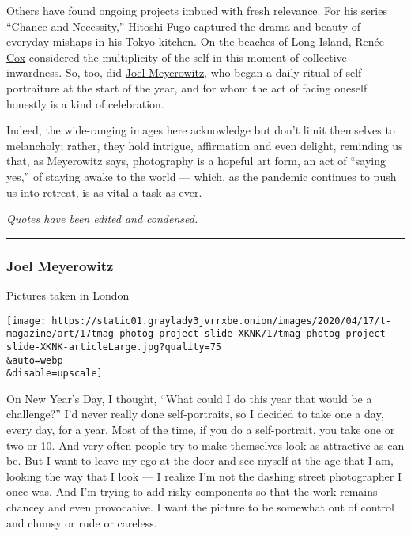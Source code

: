 Others have found ongoing projects imbued with fresh relevance. For his
series ``Chance and Necessity,'' Hitoshi Fugo captured the drama and
beauty of everyday mishaps in his Tokyo kitchen. On the beaches of Long
Island, \href{https://www.reneecox.org/}{Renée Cox} considered the
multiplicity of the self in this moment of collective inwardness. So,
too, did \href{https://www.joelmeyerowitz.com/}{Joel Meyerowitz}, who
began a daily ritual of self-portraiture at the start of the year, and
for whom the act of facing oneself honestly is a kind of celebration.

Indeed, the wide-ranging images here acknowledge but don't limit
themselves to melancholy; rather, they hold intrigue, affirmation and
even delight, reminding us that, as Meyerowitz says, photography is a
hopeful art form, an act of ``saying yes,'' of staying awake to the
world --- which, as the pandemic continues to push us into retreat, is
as vital a task as ever.

\emph{Quotes have been edited and condensed.}

\begin{center}\rule{0.5\linewidth}{\linethickness}\end{center}

\hypertarget{joel-meyerowitz}{%
\subsubsection{Joel Meyerowitz}\label{joel-meyerowitz}}

Pictures taken in London

\texttt{[image: https://static01.graylady3jvrrxbe.onion/images/2020/04/17/t-magazine/art/17tmag-photog-project-slide-XKNK/17tmag-photog-project-slide-XKNK-articleLarge.jpg?quality=75\\\&auto=webp\\\&disable=upscale]}

On New Year's Day, I thought, ``What could I do this year that would be
a challenge?'' I'd never really done self-portraits, so I decided to
take one a day, every day, for a year. Most of the time, if you do a
self-portrait, you take one or two or 10. And very often people try to
make themselves look as attractive as can be. But I want to leave my ego
at the door and see myself at the age that I am, looking the way that I
look --- I realize I'm not the dashing street photographer I once was.
And I'm trying to add risky components so that the work remains chancey
and even provocative. I want the picture to be somewhat out of control
and clumsy or rude or careless.

